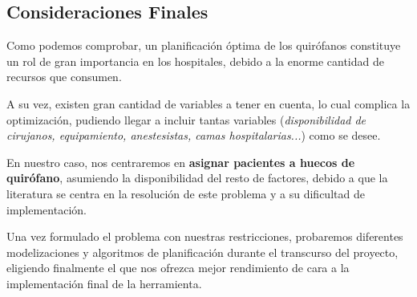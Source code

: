 \subsection{Consideraciones Finales}

Como podemos comprobar, un planificación óptima de los quirófanos constituye un rol de gran importancia en los hospitales, debido a la enorme cantidad de recursos que consumen. 

A su vez, existen gran cantidad de variables a tener en cuenta, lo cual complica \cite{Lin2020AScheduling} la optimización, pudiendo llegar a incluir tantas variables (\textit{disponibilidad de cirujanos, equipamiento, anestesistas, camas hospitalarias...}) como se desee.

En nuestro caso, nos centraremos en \textbf{asignar pacientes a huecos de quirófano}, asumiendo la disponibilidad del resto de factores, debido a que la literatura se centra en la resolución de este problema y a su dificultad de implementación.

Una vez formulado el problema con nuestras restricciones, probaremos diferentes modelizaciones y algoritmos de planificación durante el transcurso del proyecto, eligiendo finalmente el que nos ofrezca mejor rendimiento de cara a la implementación final de la herramienta.